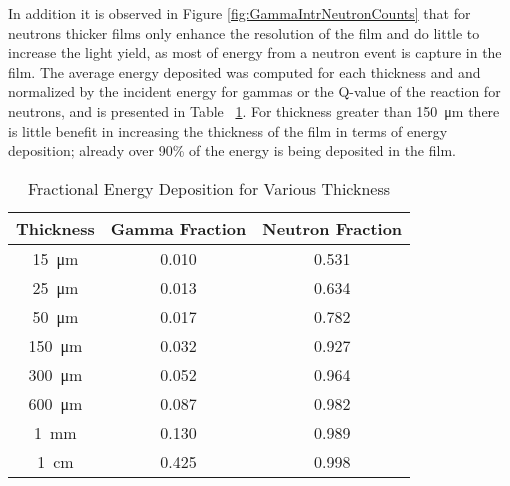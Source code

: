\documentclass[draftcls,onecolumn]{IEEEtran}
\begin{document}
In addition it is observed in Figure \ref{fig:GammaIntrNeutronCounts} that for neutrons thicker films only enhance the resolution of the film and do little to increase the light yield, as most of energy from a neutron event is capture in the film.
The average energy deposited was computed for each thickness and and normalized by the incident energy for gammas or the Q-value of the reaction for neutrons, and is presented in Table ~\ref{tab:FractionEDep}.
For thickness greater than \SI{150}{\um} there is little benefit in increasing the thickness of the film in terms of energy deposition; already over 90\% of the energy is being deposited in the film.
\begin{table}[ht]
    \caption{Fractional Energy Deposition for Various Thickness}
	\centering
	\begin{tabular}{c | c c}
	Thickness & Gamma Fraction & Neutron Fraction \\
	\hline
	\hline
	\SI{15}{\um} & 0.010 & 0.531 \\
	\SI{25}{\um} & 0.013 & 0.634 \\
	\SI{50}{\um} & 0.017 & 0.782 \\
	\SI{150}{\um} & 0.032 & 0.927 \\
	\SI{300}{\um} & 0.052 & 0.964 \\
	\SI{600}{\um} & 0.087 & 0.982 \\
	\SI{1}{\mm} & 0.130 & 0.989 \\
	\SI{1}{\cm} & 0.425 & 0.998 \\
	\end{tabular}
  \label{tab:FractionEDep}
\end{table}
\end{document}
